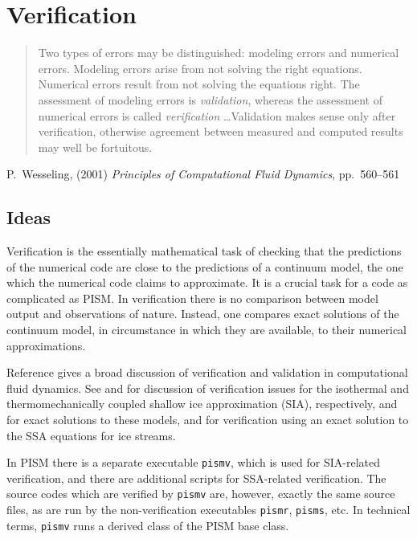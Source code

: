 
\section{Verification}\label{sec:verif}

\bigskip
\begin{quote}  Two types of errors may be distinguished: modeling errors and numerical errors.  Modeling errors arise from not solving the right equations.  Numerical errors result from not solving the equations right.  The assessment of modeling errors is \emph{validation}, whereas the assessment of numerical errors is called \emph{verification} \dots  Validation makes sense only after verification, otherwise agreement between measured and computed results may well be fortuitous.
\end{quote}
\hfill P.~Wesseling, (2001)  \emph{Principles of Computational Fluid Dynamics}, pp.~560--561 \cite{Wesseling}
\bigskip

\subsection{Ideas}  Verification is the essentially mathematical task of checking that the predictions of the numerical code are close to the predictions of a continuum model, the one which the numerical code claims to approximate.  It is a crucial task for a code as complicated as PISM. In verification there is no comparison between model output and observations of nature.  Instead, one compares exact solutions of the continuum model, in circumstance in which they are available, to their numerical approximations.

Reference \cite{Roache} gives a broad discussion of verification and validation in computational fluid dynamics. See \cite{BLKCB} and \cite{BBL} for discussion of verification issues for the isothermal and thermomechanically coupled shallow ice approximation (SIA), respectively, and for exact solutions to these models, and \cite{BBssasliding,SchoofStream} for verification using an exact solution to the SSA equations for ice streams.

In PISM there is a separate executable \texttt{pismv}, which is used
for SIA-related verification, and there are additional scripts for SSA-related
verification.  The source codes which are verified by \texttt{pismv} are,
however, exactly the same source files, as are run by the
non-verification executables \texttt{pismr}, \texttt{pisms}, etc.  In
technical terms, \texttt{pismv} runs a derived class of the PISM base class.


